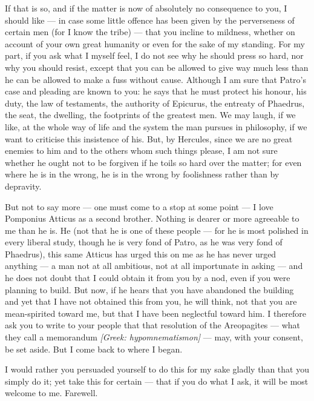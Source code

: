  If that is so, and if the matter is now of absolutely no consequence to you, I should like --- in case some little offence has been given by the perverseness of certain men (for I know the tribe) --- that you incline to mildness, whether on account of your own great humanity or even for the sake of my standing. For my part, if you ask what I myself feel, I do not see why he should press so hard, nor why you should resist, except that you can be allowed to give way much less than he can be allowed to make a fuss without cause. Although I am sure that Patro's case and pleading are known to you: he says that he must protect his honour, his duty, the law of testaments, the authority of Epicurus, the entreaty of Phaedrus, the seat, the dwelling, the footprints of the greatest men. We may laugh, if we like, at the whole way of life and the system the man pursues in philosophy, if we want to criticise this insistence of his. But, by Hercules, since we are no great enemies to him and to the others whom such things please, I am not sure whether he ought not to be forgiven if he toils so hard over the matter; for even where he is in the wrong, he is in the wrong by foolishness rather than by depravity.

 But not to say more --- one must come to a stop at some point --- I love Pomponius Atticus as a second brother. Nothing is dearer or more agreeable to me than he is. He (not that he is one of these people --- for he is most polished in every liberal study, though he is very fond of Patro, as he was very fond of Phaedrus), this same Atticus has urged this on me as he has never urged anything --- a man not at all ambitious, not at all importunate in asking --- and he does not doubt that I could obtain it from you by a nod, even if you were planning to build. But now, if he hears that you have abandoned the building and yet that I have not obtained this from you, he will think, not that you are mean-spirited toward me, but that I have been neglectful toward him. I therefore ask you to write to your people that that resolution of the Areopagites --- what they call a memorandum \textit{[Greek: hypomnematismon]} --- may, with your consent, be set aside. But I come back to where I began.

 I would rather you persuaded yourself to do this for my sake gladly than that you simply do it; yet take this for certain --- that if you do what I ask, it will be most welcome to me. Farewell.
